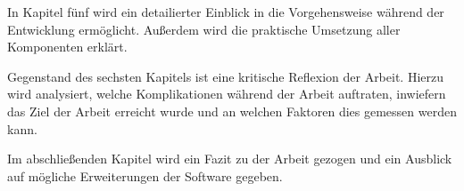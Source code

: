 In Kapitel fünf wird ein detailierter Einblick in die Vorgehensweise während der Entwicklung ermöglicht. Außerdem wird die praktische Umsetzung aller Komponenten erklärt.

\vspace{6mm}

\vspace{-2mm}

Gegenstand des sechsten Kapitels ist eine kritische Reflexion der Arbeit. Hierzu wird analysiert, welche Komplikationen während der Arbeit auftraten,
inwiefern das Ziel der Arbeit erreicht wurde und an welchen Faktoren dies gemessen werden kann.

\vspace{6mm}

\vspace{-2mm}

Im abschließenden Kapitel wird ein Fazit zu der Arbeit gezogen und ein Ausblick auf mögliche Erweiterungen der Software gegeben.
